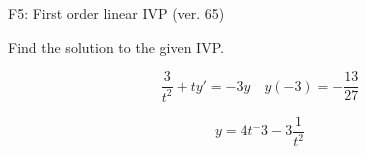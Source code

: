 \begin{exercise}
  \begin{exerciseTitle}F5: First order linear IVP (ver. 65)\end{exerciseTitle}
  \begin{exerciseStatement}
    
Find the solution to the given IVP.

    
\[\frac{3}{t^{2}} +ty'= -3 y \hspace{1em} y( -3 ) = -\frac{13}{27}\]

  \end{exerciseStatement}
  \begin{exerciseAnswer}
    
\[y= 4 t^ -3 -3 \frac{1}{t^{2}}\]

  \end{exerciseAnswer}
\end{exercise}